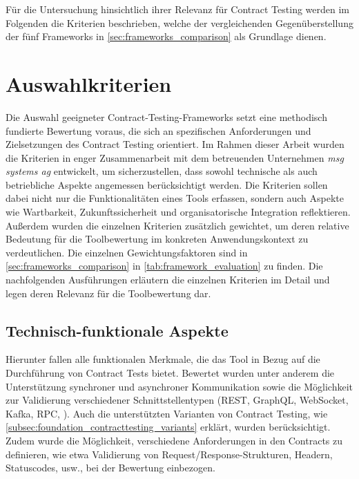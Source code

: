 Für die Untersuchung hinsichtlich ihrer Relevanz für Contract Testing werden im Folgenden die Kriterien beschrieben, welche der vergleichenden Gegenüberstellung der fünf Frameworks in \cref{sec:frameworks_comparison} als Grundlage dienen.

\section{Auswahlkriterien}\label{sec:frameworks_criteria}

Die Auswahl geeigneter Contract-Testing-Frameworks setzt eine methodisch fundierte Bewertung voraus, die sich an spezifischen Anforderungen und Zielsetzungen des Contract Testing orientiert.
Im Rahmen dieser Arbeit wurden die Kriterien in enger Zusammenarbeit mit dem betreuenden Unternehmen \textit{msg systems ag} entwickelt, um sicherzustellen, dass sowohl technische als auch betriebliche Aspekte angemessen berücksichtigt werden.
Die Kriterien sollen dabei nicht nur die Funktionalitäten eines Tools erfassen, sondern auch Aspekte wie Wartbarkeit, Zukunftssicherheit und organisatorische Integration reflektieren.
Außerdem wurden die einzelnen Kriterien zusätzlich gewichtet, um deren relative Bedeutung für die Toolbewertung im konkreten Anwendungskontext zu verdeutlichen.
Die einzelnen Gewichtungsfaktoren sind in \cref{sec:frameworks_comparison} in \cref{tab:framework_evaluation} zu finden.
Die nachfolgenden Ausführungen erläutern die einzelnen Kriterien im Detail und legen deren Relevanz für die Toolbewertung dar.

\subsection{Technisch-funktionale Aspekte}\label{subsec:frameworks_criterion_functionality}

Hierunter fallen alle funktionalen Merkmale, die das Tool in Bezug auf die Durchführung von Contract Tests bietet.
Bewertet wurden unter anderem die Unterstützung synchroner und asynchroner Kommunikation sowie die Möglichkeit zur Validierung verschiedener Schnittstellentypen (\gls{REST}, \gls{GraphQL}, WebSocket, Kafka, \gls{RPC}, \usw).
Auch die unterstützten Varianten von Contract Testing, wie \cref{subsec:foundation_contracttesting_variants} erklärt, wurden berücksichtigt.
Zudem wurde die Möglichkeit, verschiedene Anforderungen in den Contracts zu definieren, wie etwa Validierung von Request/Response-Strukturen, Headern, Statuscodes, usw., bei der Bewertung einbezogen.

